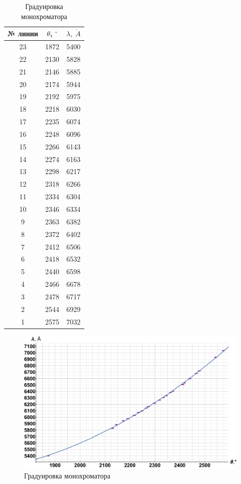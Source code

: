 \documentclass[12pt]{kiarticle} %
\begin{document}
		\begin{table}[h!]
		\caption{Градуировка монохроматора}
		\begin{center}
			\begin{tabular}{|c|c|c|}
				\hline 
				№  линии & $ \theta $, $ ^\circ $ & $ \lambda, \;\mathring{A} $   \\ 
				\hline 
			23 & 1872 & 5400 \\
			22 & 2130 & 5828 \\
			21 & 2146 & 5885 \\
			20 & 2174 & 5944 \\
			19 & 2192 & 5975 \\
			18 & 2218 & 6030 \\
			17 & 2235 & 6074 \\
			16 & 2248 & 6096 \\
			15 & 2266 & 6143 \\
			14 & 2274 & 6163 \\
			13 & 2298 & 6217 \\
			12 & 2318 & 6266 \\
			11 & 2334 & 6304 \\
			10 & 2346 & 6334 \\
			9 & 2363 & 6382 \\
			8 & 2372 & 6402 \\
			7 & 2412 & 6506 \\
			6 & 2418 & 6532 \\
			5 & 2440 & 6598 \\
			4 & 2466 & 6678 \\
			3 & 2478 & 6717 \\
			2 & 2544 & 6929 \\
			1 & 2575 & 7032 \\
				\hline 
			\end{tabular} 
		\end{center}
		\label{table g}
	\end{table}

\begin{figure}[h!]
	\includegraphics[scale=0.5]{G.pdf}
	\caption{Градуировка монохроматора}
	\label{graf_g}
\end{figure} 
\end{document}
